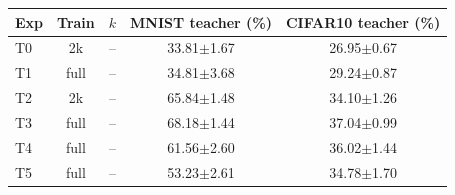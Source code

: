 \begin{tabular}{lcccc}\hline
Exp & Train & $k$ & MNIST teacher (\%) & CIFAR10 teacher (\%) \\\hline
T0 & 2k & -- & 33.81$\pm$1.67 & 26.95$\pm$0.67 \\
T1 & full & -- & 34.81$\pm$3.68 & 29.24$\pm$0.87 \\
T2 & 2k & -- & 65.84$\pm$1.48 & 34.10$\pm$1.26 \\
T3 & full & -- & 68.18$\pm$1.44 & 37.04$\pm$0.99 \\
T4 & full & -- & 61.56$\pm$2.60 & 36.02$\pm$1.44 \\
T5 & full & -- & 53.23$\pm$2.61 & 34.78$\pm$1.70 \\
\hline\end{tabular}
